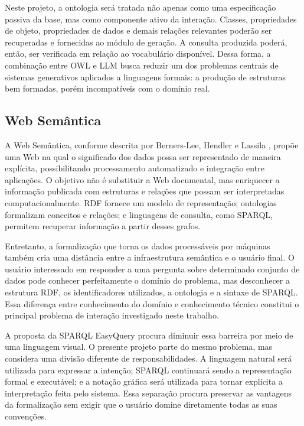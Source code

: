 \documentclass[10pt,a4paper]{article}
\begin{document}
Neste projeto, a ontologia será tratada não apenas como uma especificação passiva da base, mas como componente ativo da interação. Classes, propriedades de objeto, propriedades de dados e demais relações relevantes poderão ser recuperadas e fornecidas ao módulo de geração. A consulta produzida poderá, então, ser verificada em relação ao vocabulário disponível. Dessa forma, a combinação entre OWL e LLM busca reduzir um dos problemas centrais de sistemas generativos aplicados a linguagens formais: a produção de estruturas bem formadas, porém incompatíveis com o domínio real.

\subsection{Web Semântica}

A Web Semântica, conforme descrita por Berners-Lee, Hendler e Lassila \cite{berners2001}, propõe uma Web na qual o significado dos dados possa ser representado de maneira explícita, possibilitando processamento automatizado e integração entre aplicações. O objetivo não é substituir a Web documental, mas enriquecer a informação publicada com estruturas e relações que possam ser interpretadas computacionalmente. RDF fornece um modelo de representação; ontologias formalizam conceitos e relações; e linguagens de consulta, como SPARQL, permitem recuperar informação a partir desses grafos.

Entretanto, a formalização que torna os dados processáveis por máquinas também cria uma distância entre a infraestrutura semântica e o usuário final. O usuário interessado em responder a uma pergunta sobre determinado conjunto de dados pode conhecer perfeitamente o domínio do problema, mas desconhecer a estrutura RDF, os identificadores utilizados, a ontologia e a sintaxe de SPARQL. Essa diferença entre conhecimento do domínio e conhecimento técnico constitui o principal problema de interação investigado neste trabalho.

A proposta da SPARQL EasyQuery procura diminuir essa barreira por meio de uma linguagem visual. O presente projeto parte do mesmo problema, mas considera uma divisão diferente de responsabilidades. A linguagem natural será utilizada para expressar a intenção; SPARQL continuará sendo a representação formal e executável; e a notação gráfica será utilizada para tornar explícita a interpretação feita pelo sistema. Essa separação procura preservar as vantagens da formalização sem exigir que o usuário domine diretamente todas as suas convenções.
\end{document}
